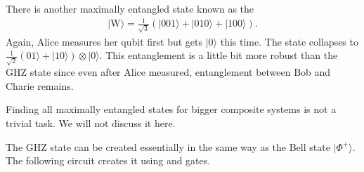 \documentclass[letterpaper,10pt,english]{jupyterBook}
\begin{document}
\sphinxAtStartPar
There is another maximally entangled state known as the 
\begin{equation*}
\begin{split}
|\text{W}\rangle = \frac{1}{\sqrt{3}} \left(|001\rangle + |010\rangle + |100\rangle\right).
\end{split}
\end{equation*}
\sphinxAtStartPar
Again, Alice measures her qubit first but gets \(|0\rangle\) this time.  The state collapses to \(\frac{1}{\sqrt{2}}\left(01\rangle + |10\rangle\right) \otimes |0\rangle\).
This entanglement is a little bit more robust than the GHZ state since even after Alice measured, entanglement between Bob and Charie remains.

\sphinxAtStartPar
Finding all maximally entangled states for bigger composite systems is not a trivial task. We will not discuss it here.

\sphinxAtStartPar
{}

\sphinxAtStartPar
The GHZ state can be created essentially in the same way as the Bell state \(|\Phi^{+}\rangle\).  The following circuit creates it using  and  gates.
\end{document}
